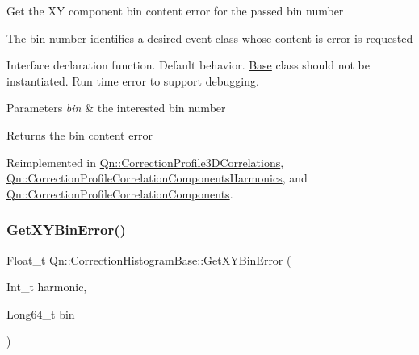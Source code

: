 Get the XY component bin content error for the passed bin number

The bin number identifies a desired event class whose content is error is requested

Interface declaration function. Default behavior. \mbox{\hyperlink{classBase}{Base}} class should not be instantiated. Run time error to support debugging.


\begin{DoxyParams}{Parameters}
{\em bin} & the interested bin number \\
\hline
\end{DoxyParams}
\begin{DoxyReturn}{Returns}
the bin content error 
\end{DoxyReturn}


Reimplemented in \mbox{\hyperlink{classQn_1_1CorrectionProfile3DCorrelations_a4fe7d57e81c21e72da9c0ca3c3d9f238}{Qn\+::\+Correction\+Profile3\+D\+Correlations}}, \mbox{\hyperlink{classQn_1_1CorrectionProfileCorrelationComponentsHarmonics_a4dbf495bfa861a2cf2a59182271c43a9}{Qn\+::\+Correction\+Profile\+Correlation\+Components\+Harmonics}}, and \mbox{\hyperlink{classQn_1_1CorrectionProfileCorrelationComponents_a58d233f34fbbf505d6abb2cf3236c60f}{Qn\+::\+Correction\+Profile\+Correlation\+Components}}.

\mbox{\label{classQn_1_1CorrectionHistogramBase_afcd23dbf89783fd907ccbe90ca4a776b}} 
\subsubsection{\texorpdfstring{Get\+X\+Y\+Bin\+Error()}{GetXYBinError()}\hspace{0.1cm}{\footnotesize\ttfamily [2/2]}}
{\footnotesize\ttfamily Float\+\_\+t Qn\+::\+Correction\+Histogram\+Base\+::\+Get\+X\+Y\+Bin\+Error (\begin{DoxyParamCaption}\item[{Int\+\_\+t}]{harmonic,  }\item[{Long64\+\_\+t}]{bin }\end{DoxyParamCaption})\hspace{0.3cm}{\ttfamily [virtual]}}

